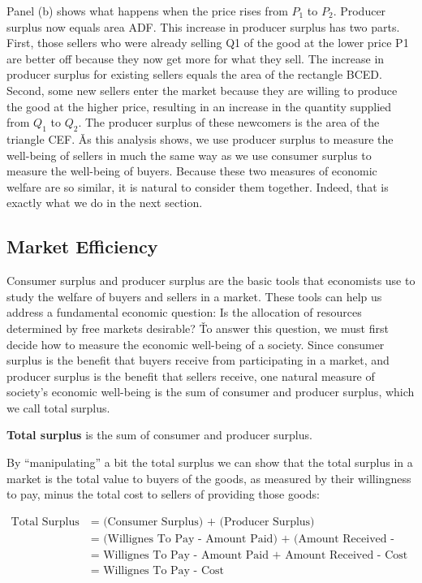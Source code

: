 
Panel (b) shows what happens when the price rises from $P_1$ to $P_2$. Producer surplus now equals area ADF. This
increase in producer surplus has two parts. First, those sellers who were already selling Q1 of the good at the lower
price P1 are better off because they now get more for what they sell. The increase in producer surplus for existing
sellers equals the area of the rectangle BCED. Second, some new sellers enter the market because they are willing to
produce the good at the higher price, resulting in an increase in the quantity supplied from $Q_1$ to $Q_2$. The
producer surplus of these newcomers is the area of the triangle CEF. \v

As this analysis shows, we use producer surplus to measure the well-being of sellers in much the same way as we use
consumer surplus to measure the well-being of buyers. Because these two measures of economic welfare are so similar,
it is natural to consider them together. Indeed, that is exactly what we do in the next section.

\subsection{Market Efficiency}

Consumer surplus and producer surplus are the basic tools that economists use to study the welfare of buyers and
sellers in a market. These tools can help us address a fundamental economic question: Is the allocation of resources
determined by free markets desirable? \v

To answer this question, we must first decide how to measure the economic well-being of a society. Since consumer
surplus is the benefit that buyers receive from participating in a market, and producer surplus is the benefit that
sellers receive, one natural measure of society's economic well-being is the sum of consumer and producer surplus,
which we call total surplus.

\textbf{Total surplus} is the sum of consumer and producer surplus.
\ed

By ``manipulating'' a bit the total surplus we can show that the total surplus in a market is the total value to
buyers of the goods, as measured by their willingness to pay, minus the total cost to sellers of providing those goods:

\begin{align}
\text{Total Surplus } & \text{= (Consumer Surplus) + (Producer Surplus)} \nonumber \\
& \text{= (Willignes To Pay - Amount Paid) + (Amount Received - Cost)} \nonumber \\
& \text{= Willignes To Pay - Amount Paid + Amount Received - Cost} \nonumber \\
& \text{= Willignes To Pay - Cost} \nonumber
\end{align}

